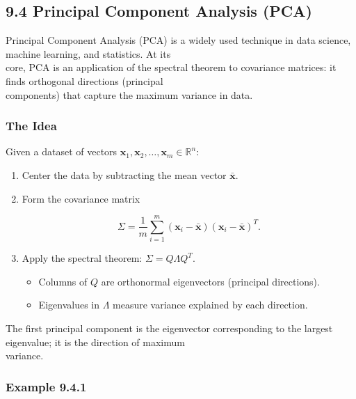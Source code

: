 \documentclass[
  12pt,
  a4paper,
]{article}
\begin{document}
\subsection{9.4 Principal Component Analysis
(PCA)}\label{94-principal-component-analysis-pca}

Principal Component Analysis (PCA) is a widely used technique in data
science, machine learning, and statistics. At its\\
core, PCA is an application of the spectral theorem to covariance
matrices: it finds orthogonal directions (principal\\
components) that capture the maximum variance in data.

\subsubsection{The Idea}\label{the-idea-2}

Given a dataset of vectors
\(\mathbf{x}_1, \mathbf{x}_2, \dots, \mathbf{x}_m \in \mathbb{R}^n\):

\begin{enumerate}
\def\labelenumi{\arabic{enumi}.}
\item
  Center the data by subtracting the mean vector \(\bar{\mathbf{x}}\).
\item
  Form the covariance matrix

  \[\Sigma = \frac{1}{m} \sum_{i=1}^m (\mathbf{x}_i - \bar{\mathbf{x}})(\mathbf{x}_i - \bar{\mathbf{x}})^T.\]
\item
  Apply the spectral theorem: \(\Sigma = Q \Lambda Q^T\).

  \begin{itemize}
  \item
    Columns of \(Q\) are orthonormal eigenvectors (principal
    directions).
  \item
    Eigenvalues in \(\Lambda\) measure variance explained by each
    direction.
  \end{itemize}
\end{enumerate}

The first principal component is the eigenvector corresponding to the
largest eigenvalue; it is the direction of maximum\\
variance.

\subsubsection{Example 9.4.1}\label{example-941}
\end{document}
